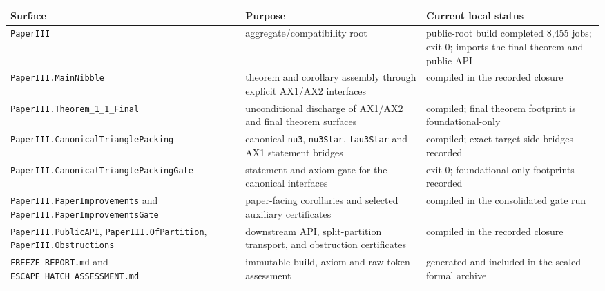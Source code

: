 \documentclass[
  american,
  11pt,
  a4paper,
]{article}
\newcounter{none} %
\begin{document}
{\def\LTcaptype{none} %
\begin{longtable}[]{@{}
  >{\raggedright\arraybackslash}p{}
  >{\raggedright\arraybackslash}p{}
  >{\raggedright\arraybackslash}p{}@{}}
\toprule\noalign{}
\begin{minipage}[b]{\linewidth}\raggedright
Surface
\end{minipage} & \begin{minipage}[b]{\linewidth}\raggedright
Purpose
\end{minipage} & \begin{minipage}[b]{\linewidth}\raggedright
Current local status
\end{minipage} \\
\midrule\noalign{}
\endhead
\bottomrule\noalign{}
\endlastfoot
\texttt{PaperIII} & aggregate/compatibility root & public-root build completed 8,455 jobs; exit 0; imports the final theorem and public API \\
\texttt{PaperIII.MainNibble} & theorem and corollary assembly through explicit AX1/AX2 interfaces & compiled in the recorded closure \\
\texttt{PaperIII.Theorem\_1\_1\_Final} & unconditional discharge of AX1/AX2 and final theorem surfaces & compiled; final theorem footprint is foundational-only \\
\texttt{PaperIII.CanonicalTrianglePacking} & canonical \texttt{nu3}, \texttt{nu3Star}, \texttt{tau3Star} and AX1 statement bridges & compiled; exact target-side bridges recorded \\
\texttt{PaperIII.CanonicalTrianglePacking\allowbreak{}Gate} & statement and axiom gate for the canonical interfaces & exit 0; foundational-only footprints recorded \\
\texttt{PaperIII.PaperImprovements} and \texttt{PaperIII.PaperImprovementsGate} & paper-facing corollaries and selected auxiliary certificates & compiled in the consolidated gate run \\
\texttt{PaperIII.PublicAPI}, \texttt{PaperIII.OfPartition}, \texttt{PaperIII.Obstructions} & downstream API, split-partition transport, and obstruction certificates & compiled in the recorded closure \\
\texttt{FREEZE\_REPORT.md} and \texttt{ESCAPE\_HATCH\_ASSESSMENT.md} & immutable build, axiom and raw-token assessment & generated and included in the sealed formal archive \\
\end{longtable}
}
\end{document}
